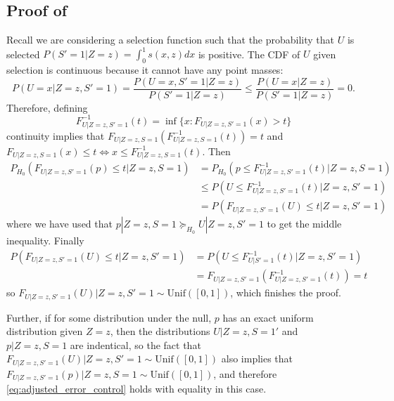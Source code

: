 \documentclass{article}
\begin{document}
\begin{appendix}
\subsection{Proof of }
Recall we are considering a selection function such that the probability that $U$ is selected $P(S'=1 | Z= z) = \int_0^1 s(x, z) dx$ is positive. The CDF of $U$ given selection is continuous because it cannot have any point masses:
\begin{equation*}
    P(U = x | Z=z, S' = 1) = \frac{P(U = x, S' = 1| Z=z)}{P(S'=1 |Z=z)} \leq \frac{P(U = x|Z=z)}{P(S'=1|Z=z)} =  0. 
\end{equation*}
Therefore, defining 
\begin{equation*}
    F^{-1}_{U |Z=z, S'=1}(t)  = \inf \{x: F_{U |Z=z, S' = 1}(x) > t  \}
\end{equation*}
continuity implies that $F_{U|Z=z, S =1}(F^{-1}_{U |Z=z, S=1}(t)) = t$ and $F_{U | Z=z, S = 1}(x) \leq t \iff x \leq  F^{-1}_{U | Z=z, S = 1}(t)$. Then 
\begin{align*}
    P_{H_0}(F_{U | Z=z, S' = 1}(p) \leq  t |Z=z, S=1) &= P_{H_0}(p \leq F_{U |Z=z,  S' = 1}^{-1}(t) | Z=z, S=1) \\
    &\leq P(U \leq F_{U |Z=z, S' = 1}^{-1}(t) |Z=z, S'=1) \\
    &= P(F_{U|Z=z, S' = 1}(U) \leq t |Z=z, S'=1)
\end{align*}
where we have used that $p | Z=z, S=1 \succeq_{H_0} U |Z=z, S'=1$ to get the middle inequality. Finally 
\begin{align*}
    P(F_{U|Z=z, S' = 1}(U) \leq t |Z=z, S'=1) &= P(U \leq F_{U|S' = 1}^{-1}(t) | Z=z, S'=1) \\
    &= F_{U|Z=z, S'=1}(F_{U|Z=z, S' = 1}^{-1}(t)) = t
\end{align*}
so $F_{U|Z=z, S' = 1}(U) |Z=z, S' = 1 \sim \text{Unif}([0, 1])$, which finishes the proof. 

Further, if for some distribution under the null, $p$ has an exact uniform distribution given $Z=z$, then the distributions $U | Z = z, S= 1'$ and $p | Z= z , S=1$ are indentical, so the fact that $F_{U|Z=z, S' = 1}(U) |Z=z, S' = 1 \sim \text{Unif}([0, 1])$ also implies that $F_{U|Z=z, S' = 1}(p) |Z=z, S = 1 \sim \text{Unif}([0, 1])$, and therefore \eqref{eq:adjusted_error_control} holds with equality in this case. 
 

\end{appendix}
\end{document}
